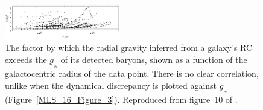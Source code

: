 \documentclass[fleqn,usenatbib,useAMS]{mnras} %
\begin{document}
\begin{figure}
	\centering
	\includegraphics[width=0.45\textwidth]{Famaey_McGaugh_2012_Figure_10_r}
	\caption{The factor by which the radial gravity inferred from a galaxy's RC exceeds the $g_{_N}$ of its detected baryons, shown as a function of the galactocentric radius of the data point. There is no clear correlation, unlike when the dynamical discrepancy is plotted against $g_{_N}$ (Figure~\ref{MLS_16_Figure_3}). Reproduced from figure~10 of \citet{Famaey_McGaugh_2012}.}
	\label{Famaey_McGaugh_2012_Figure_10_r}
\end{figure}
\end{document}
